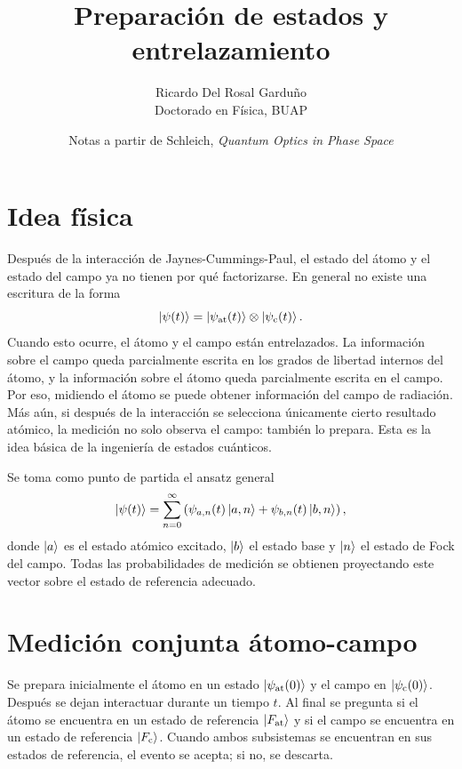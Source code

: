 \documentclass[11pt]{article}
\title{Preparaci\'on de estados y entrelazamiento}
\author{Ricardo Del Rosal Gardu\~no \\ \small Doctorado en F\'isica, BUAP}
\date{Notas a partir de Schleich, \emph{Quantum Optics in Phase Space}}
\begin{document}
\maketitle

\tableofcontents
\bigskip

\section{Idea f\'isica}

Despu\'es de la interacci\'on de Jaynes-Cummings-Paul, el estado del \'atomo y
el estado del campo ya no tienen por qu\'e factorizarse. En general no existe
una escritura de la forma
\begin{equation}
  \ket{\psi(t)}
  =
  \ket{\psi_{\mathrm{at}}(t)}
  \otimes
  \ket{\psi_{\mathrm{c}}(t)} .
\end{equation}
Cuando esto ocurre, el \'atomo y el campo est\'an entrelazados. La informaci\'on
sobre el campo queda parcialmente escrita en los grados de libertad internos
del \'atomo, y la informaci\'on sobre el \'atomo queda parcialmente escrita en
el campo. Por eso, midiendo el \'atomo se puede obtener informaci\'on del campo
de radiaci\'on. M\'as a\'un, si despu\'es de la interacci\'on se selecciona
\'unicamente cierto resultado at\'omico, la medici\'on no solo observa el campo:
tambi\'en lo prepara. Esta es la idea b\'asica de la ingenier\'ia de estados
cu\'anticos.

Se toma como punto de partida el ansatz general
\begin{equation}
  \ket{\psi(t)}
  =
  \sum_{n=0}^{\infty}
  \left(
  \psi_{a,n}(t)\ket{a,n}
  +
  \psi_{b,n}(t)\ket{b,n}
  \right),
\end{equation}
donde $\ket{a}$ es el estado at\'omico excitado, $\ket{b}$ el estado base y
$\ket{n}$ el estado de Fock del campo. Todas las probabilidades de medici\'on
se obtienen proyectando este vector sobre el estado de referencia adecuado.

\section{Medici\'on conjunta \'atomo-campo}

Se prepara inicialmente el \'atomo en un estado $\ket{\psi_{\mathrm{at}}(0)}$
y el campo en $\ket{\psi_{\mathrm{c}}(0)}$. Despu\'es se dejan interactuar
durante un tiempo $t$. Al final se pregunta si el \'atomo se encuentra en un
estado de referencia $\ket{F_{\mathrm{at}}}$ y si el campo se encuentra en un
estado de referencia $\ket{F_{\mathrm{c}}}$. Cuando ambos subsistemas se
encuentran en sus estados de referencia, el evento se acepta; si no, se
descarta.
\end{document}
